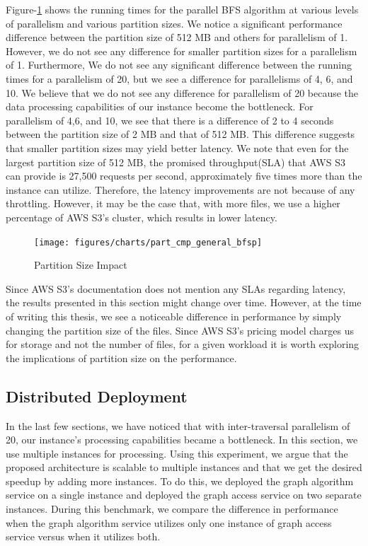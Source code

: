 \smallskip
Figure-\ref{fig:partitionSizeImp} shows the running times for the parallel BFS
algorithm at various levels of parallelism and various partition sizes. We
notice a significant performance difference between the partition size of 512 MB and
others for parallelism of 1. However, we do not see any difference for smaller
partition sizes for a parallelism of 1. Furthermore, We do
not see any significant difference between the running times for a parallelism of
20, but we see a difference for parallelisms of 4, 6, and 10.
We believe that we do not see any difference for parallelism of 20
because the data processing capabilities of our instance become the bottleneck.
For parallelism of 4,6, and 10, we see that there is a difference of 2 to 4
seconds between the partition size of 2 MB and that of 512 MB. This difference suggests that
smaller partition sizes may yield better latency. We note that even for the
largest partition size of 512 MB, the promised throughput(SLA) that AWS S3 can
provide is
27,500 requests per second, approximately five times more than the
instance can utilize. Therefore, the latency improvements are not because
of any throttling. However, it may be the case that, with more files, we use
a higher percentage of AWS S3's cluster, which results in lower
latency.
\begin{figure}[ht]
    \centering
    \texttt{[image: figures/charts/part\_cmp\_general\_bfsp]}
    \caption{Partition Size Impact}
    \label{fig:partitionSizeImp}
\end{figure}

\medskip
Since AWS S3's documentation does not mention any SLAs regarding latency,
the results presented in this section might change over time. However, at the time of
writing this thesis, we see a noticeable difference in performance by simply
changing the partition size of the files. Since AWS S3's pricing model charges
us for storage and not the number of files, for a given workload it is
worth exploring the implications of partition size on the performance.

\subsection{Distributed Deployment}\label{sec:distDeploy}
In the last few sections, we have noticed that with inter-traversal parallelism
of 20, our instance's processing capabilities became a bottleneck. In this
section, we use multiple instances for processing. Using this experiment, we
argue that the proposed architecture is scalable to multiple instances and that
we get the desired speedup by adding more instances. To do this, we
deployed the graph algorithm service on a single instance and deployed the graph access
service on two separate instances. During this benchmark, we compare the
difference in performance when the graph algorithm service utilizes only one
instance of graph access service versus when it utilizes both.

